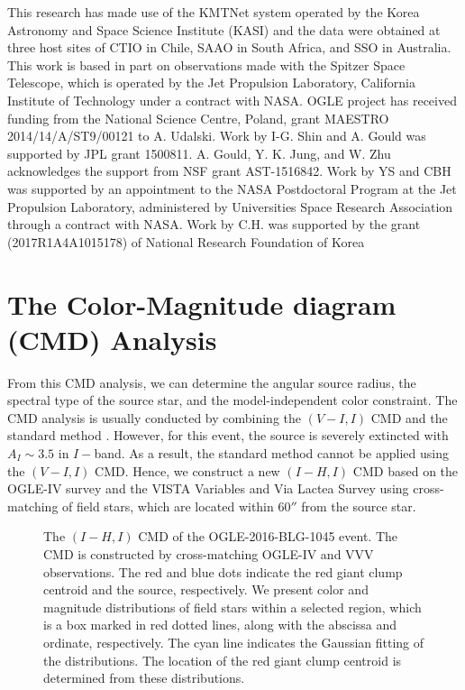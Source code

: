 \documentclass[10pt]{emulateapj}
\begin{document}
\mbox{}

\acknowledgments 
%
This research has made use of the KMTNet system operated by the Korea Astronomy and Space Science 
Institute (KASI) and the data were obtained at three host sites of CTIO in Chile, SAAO in South 
Africa, and SSO in Australia. 
%
This work is based in part on observations made with the Spitzer Space Telescope, which is 
operated by the Jet Propulsion Laboratory, California Institute of Technology under a contract 
with NASA.
%
OGLE project has received funding from the National Science Centre, Poland, grant MAESTRO 
2014/14/A/ST9/00121 to A. Udalski.
%
Work by I-G. Shin and A. Gould was supported by JPL grant 1500811.
%
A. Gould, Y. K. Jung, and W. Zhu acknowledges the support from NSF grant AST-1516842.
%
Work by YS and CBH was supported by an appointment to the NASA Postdoctoral Program at 
the Jet Propulsion Laboratory, administered by Universities Space Research Association 
through a contract with NASA. 
%
Work by C.H. was supported by the grant (2017R1A4A1015178) of National Research Foundation of Korea
%

\appendix
\section{The Color-Magnitude diagram (CMD) Analysis}

 From this CMD analysis, we can determine the angular source radius, the spectral type of 
the source star, and the model-independent color constraint. The CMD analysis is usually 
conducted by combining the $(V-I, I)$ CMD and the standard method \citep{yoo04}. However, 
for this event, the source is severely extincted with $A_I \sim 3.5$ in $I-$band. As a result, 
the standard method cannot be applied using the $(V-I,I)$ CMD. Hence, we construct a new 
$(I-H, I)$ CMD based on the OGLE-IV survey and the VISTA Variables and Via Lactea Survey 
\citep[VVV:][]{minniti10} using cross-matching of field stars, which are located within 
$60''$ from the source star.

\begin{figure}[htb!]
\caption{
The $(I-H, I)$ CMD of the OGLE-2016-BLG-1045 event. The CMD is constructed by cross-matching OGLE-IV 
and VVV observations. The red and blue dots indicate the red giant clump centroid and the source,
respectively. We present color and magnitude distributions of field stars within a selected region, 
which is a box marked in red dotted lines, along with the abscissa and ordinate, respectively. The cyan 
line indicates the Gaussian fitting of the distributions. The location of the red giant clump centroid 
is determined from these distributions.
\label{fig:app1}}
\end{figure}
\end{document}
